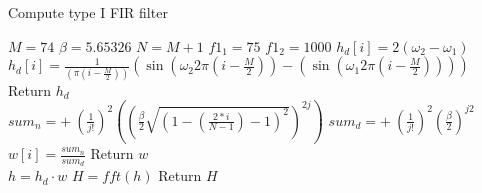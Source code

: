 \begin{algorithm}[H]
\caption{Compute type I FIR filter}
\label{alg:FIR}
\begin{algorithmic}[1] 
\State $M = 74$  
\State $\beta = 5.65326$ 
\State $N = M+1$ 
\State $f1_1 = 75$ 
\State $f1_2 = 1000$ 
        		\State $h_d[i] = 2(\omega_2 - \omega_1)$
        	\Else 
        		\State  $h_d[i] = \frac{1}{ (\pi (i - \frac{M}{2}))}(\sin(\omega_2 2 \pi (i - \frac{M}{2})) - (\sin(\omega_1 2 \pi (i - \frac{M}{2}))))$ 
        	\EndIf 
	\EndFor
	\State Return $h_d$
\EndProcedure
\\
			\State $ sum_n = + \ (\frac{1}{j!})^2 \left( \left( \frac{\beta}{2} \sqrt{\left(1 - \left( \frac{2*i}{N-1}\right) - 1\right)^2}\right)^{2j}\right)$
			\State $ sum_d = + \ (\frac{1}{j!})^2 \left( \frac{\beta}{2}\right)^{j2}$
		\EndFor
		\State $w[i]=\frac{sum_n}{sum_d}$
	\EndFor
	\State Return $w$
\EndProcedure
\\
	\State $h = h_d \cdot w$ 
	\State $H = fft(h)$ 
	\State Return $H$
\EndProcedure

\end{algorithmic}
\end{algorithm}